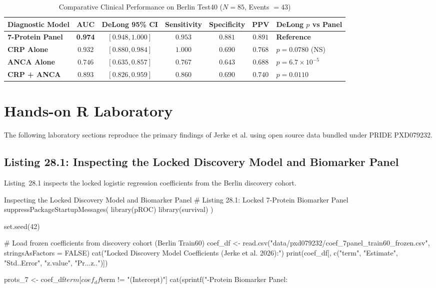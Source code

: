 \documentclass[11pt,twoside,openright]{book}
\begin{document}
\begin{table}[ht]
\centering
\caption{Comparative Clinical Performance on Berlin Test40 ($N = 85$, Events $= 43$)}
\label{tab:clinical_comparison}
\small
\begin{tabularx}{\textwidth}{l c c c c c X}
\toprule
\textbf{Diagnostic Model} & \textbf{AUC} & \textbf{DeLong 95\% CI} & \textbf{Sensitivity} & \textbf{Specificity} & \textbf{PPV} & \textbf{DeLong $p$ vs Panel} \\
\midrule
\textbf{7-Protein Panel} & \textbf{0.974} & $[0.948, 1.000]$ & $0.953$ & $0.881$ & $0.891$ & \textbf{Reference} \\
\addlinespace
\textbf{CRP Alone} & $0.932$ & $[0.880, 0.984]$ & $1.000$ & $0.690$ & $0.768$ & $p = 0.0780$ (NS) \\
\addlinespace
\textbf{ANCA Alone} & $0.746$ & $[0.635, 0.857]$ & $0.767$ & $0.643$ & $0.688$ & $p = 6.7 \times 10^{-5}$ \\
\addlinespace
\textbf{CRP + ANCA} & $0.893$ & $[0.826, 0.959]$ & $0.860$ & $0.690$ & $0.740$ & $p = 0.0110$ \\
\bottomrule
\end{tabularx}
\end{table}

\FloatBarrier

\section{Hands-on R Laboratory}

The following laboratory sections reproduce the primary findings of Jerke et al. \cite{jerke2026vasculitis} using open source data bundled under PRIDE PXD079232.

\subsection{Listing 28.1: Inspecting the Locked Discovery Model and Biomarker Panel}

Listing~28.1 inspects the locked logistic regression coefficients from the Berlin discovery cohort.

\begin{rchunk}{Inspecting the Locked Discovery Model and Biomarker Panel}
# Listing 28.1: Locked 7-Protein Biomarker Panel
suppressPackageStartupMessages({
  library(pROC)
  library(survival)
})

set.seed(42)

# Load frozen coefficients from discovery cohort (Berlin Train60)
coef_df <- read.csv("data/pxd079232/coef_7panel_train60_frozen.csv", stringsAsFactors = FALSE)
cat("Locked Discovery Model Coefficients (Jerke et al. 2026):\n")
print(coef_df[, c("term", "Estimate", "Std..Error", "z.value", "Pr...z..")])

prots_7 <- coef_df$term[coef_df$term != "(Intercept)"]
cat(sprintf("-Protein Biomarker Panel: %
\end{rchunk}
\end{document}
